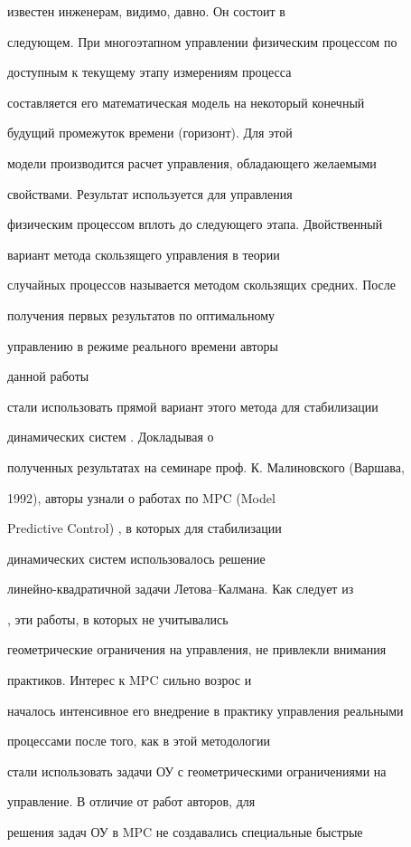 известен инженерам, видимо, давно. Он состоит в


следующем. При многоэтапном управлении физическим процессом по


доступным к текущему этапу измерениям процесса


составляется его математическая модель на некоторый конечный


будущий промежуток времени (горизонт). Для этой


модели производится расчет управления, обладающего желаемыми


свойствами. Результат используется для управления


физическим процессом вплоть до следующего этапа. Двойственный


вариант метода скользящего управления в теории


случайных процессов называется методом скользящих средних. После


получения первых результатов по оптимальному


управлению в режиме реального времени \cite{DAN_1991} авторы


данной работы


стали использовать прямой вариант этого метода для стабилизации


динамических систем \cite{TK}. Докладывая о


полученных результатах на семинаре проф. К. Малиновского (Варшава,


1992), авторы узнали о работах по MPC (Model


Predictive Control) \cite{Kwon}, в которых для стабилизации


динамических систем использовалось решение


линейно-квадратичной задачи Летова--Калмана. Как следует из


\cite{Qin}, эти работы, в которых не учитывались


геометрические ограничения на управления, не привлекли внимания


практиков. Интерес к MPC сильно возрос и


началось интенсивное его внедрение в практику управления реальными


процессами после того, как в этой методологии


стали использовать задачи ОУ с геометрическими ограничениями на


управление. В отличие от работ авторов, для


решения задач ОУ в MPC не создавались специальные быстрые


